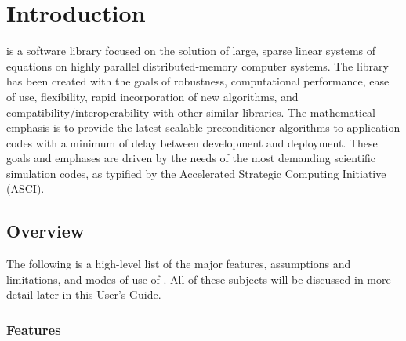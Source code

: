 \chapter{Introduction}
\label{Introduction}

\hypre{} is a software library focused on the solution of large, sparse linear
systems of equations on highly 
parallel distributed-memory computer systems. The library has been created with
the goals of robustness, 
computational performance, ease of use, flexibility, rapid incorporation of new
algorithms, and 
compatibility/interoperability with other similar libraries. The mathematical
emphasis is to provide the 
latest scalable preconditioner algorithms to application codes with a minimum
of delay between 
development and deployment. These goals and emphases are driven by the needs of
the most demanding 
scientific simulation codes, as typified by the Accelerated Strategic Computing
Initiative (ASCI).

\section{Overview}

The following is a high-level list of the major features, assumptions and
limitations, and modes of use of 
\hypre{}. All of these subjects will be discussed in more detail later in this
User's Guide.

\subsection{Features}

